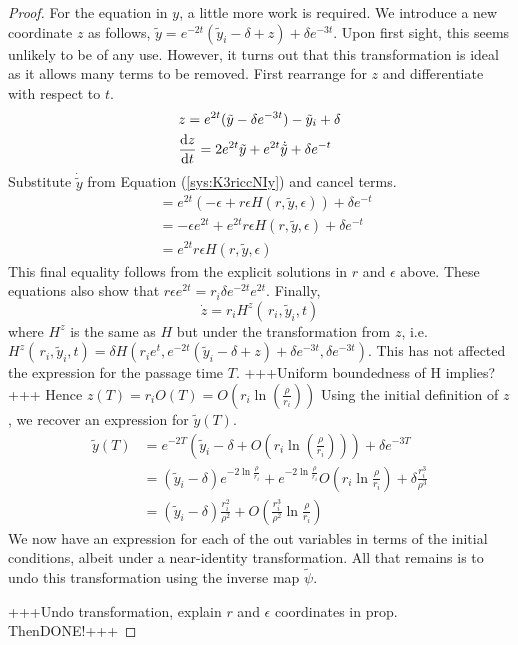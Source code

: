 \begin{proof}
	For the equation in $y$, a little more work is required. We introduce a new coordinate $z$ as follows, $\tilde{y}=e^{-2t}(\tilde{y}_i-\delta+z)+\delta  e^{-3t}$. Upon first sight, this seems unlikely to be of any use. However, it turns out that this transformation is ideal as it allows many terms to be removed. First rearrange for $z$ and differentiate with respect to $t$.
	\begin{align*}
	&z=e^{2t} (\tilde{y}-\delta e^{-3t})-\tilde{y}_i+\delta\\
	&\od{z}{t}= 2e^{2t}\tilde{y}+e^{2t}\dot{\tilde{y}}+\delta e^{-t}
	\end{align*}
	Substitute $\dot{\tilde{y}}$ from Equation (\ref{sys:K3riccNIy}) and cancel terms. 
	\begin{align*}
	&=e^{2t}(-\epsilon+r\epsilon H(r,\tilde{y},\epsilon))+\delta e^{-t}\\
	&=-\epsilon e^{2t}+e^{2t}r\epsilon  H(r,\tilde{y},\epsilon) + \delta e^{-t}\\
	&=e^{2t}r\epsilon  H(r,\tilde{y},\epsilon)
	\end{align*}
	This final equality follows from the explicit solutions in $r$ and $\epsilon$ above. These equations also show that $r\epsilon e^{2t} = r_i\delta e^{-2t}e^{2t}$. Finally,
	$$\dot{z} = r_iH^z(\,r_i,\tilde{y}_i,t)$$
	where $H^z$ is the same as $H$ but under the transformation from $z$, i.e. $H^z(\,r_i,\tilde{y}_i,t) = \delta H(r_ie^t,e^{-2t}(\tilde{y}_i-\delta+z)+\delta e^{-3t}, \delta e^{-3t})$. This has not affected the expression for the passage time $T$. +++Uniform boundedness of H implies?+++ Hence $z(T)=r_iO(T)=O(r_i\ln (\frac{\rho}{r_i}))$
	Using the initial definition of $z$, we recover an expression for $\tilde{y}(T)$.
	\begin{align*}
	\tilde{y}(T)&=e^{-2T}\left(\tilde{y}_i-\delta+O\left(r_i\ln\left(\frac{\rho}{r_i}\right)\right)\right)+\delta e^{-3T}\\
	&=(\tilde{y}_i-\delta)e^{-2\ln\frac{\rho}{r_i}}+e^{-2\ln\frac{\rho}{r_i}}O\left(r_i\ln\frac{\rho}{r_i}\right)+\delta \frac{r_i^3}{\rho^3}\\
	&=(\tilde{y}_i-\delta)\frac{r_i^2}{\rho^2}+O\left(\frac{r_i^3}{\rho^2}\ln\frac{\rho}{r_i}\right)
	\end{align*}
	We now have an expression for each of the out variables in terms of the initial conditions, albeit under a near-identity transformation. All that remains is to undo this transformation using the inverse map $\tilde{\psi}$.
	
	+++Undo transformation, explain $r$ and $\epsilon$ coordinates in prop. ThenDONE!+++
\end{proof}

